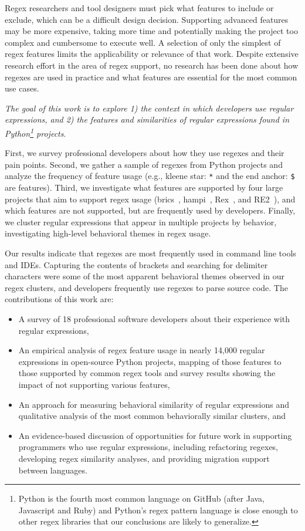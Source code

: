 Regex researchers and tool designers must pick what features to include or exclude, which  can be a difficult  design decision. Supporting advanced features may be more expensive, taking more time and potentially making the project too complex and cumbersome to execute well.  A selection of only the simplest of regex features limits the applicability or relevance of that work. Despite extensive research effort in the area of regex support,  no research has been done about how regexes are used in practice and what features are essential for the most common use cases.


\emph{The goal of this work is to explore 1) the context in which developers use regular expressions, and 2) the features and similarities of  regular expressions found in Python\footnote{Python is the fourth most common language on GitHub (after Java, Javascript and Ruby) and  Python's regex pattern language is close enough to other regex libraries that our conclusions are likely to generalize.} projects}.

First, we survey professional developers about how they use regexes and their pain points.  Second, we gather a sample of regexes from Python projects and analyze the frequency of feature usage (e.g., kleene star: \verb!*! and the end anchor: \verb!$! are features).    Third, we investigate what features are supported by four large projects that aim to support regex usage (brics~\cite{brics}, hampi~\cite{hampi}, Rex~\cite{rex}, and RE2~\cite{re2}), and which features are not supported, but are frequently used by developers.  Finally, we cluster regular expressions that appear in multiple projects by behavior, investigating high-level behavioral themes in regex usage.

Our results indicate that regexes are most frequently used in command line tools and IDEs.    Capturing the contents of brackets and searching for delimiter characters were some of the most apparent  behavioral themes observed in our regex clusters, and developers frequently use regexes to parse source code.
The contributions of this work are:
\begin{itemize} \setlength \itemsep{.1pt}
    \item A survey of 18 professional software developers about their experience with regular expressions,
    \item An empirical analysis of regex feature usage in nearly 14,000 regular expressions in  open-source Python projects, mapping of those features to those supported by common regex tools and survey results showing the impact of not supporting various features,
    \item An approach for measuring behavioral similarity of regular expressions and qualitative analysis of the most common behaviorally similar clusters, and
    \item An evidence-based discussion of opportunities for future work in supporting programmers who use regular expressions, including refactoring regexes, developing regex similarity analyses, and providing migration support between languages.
\end{itemize}

